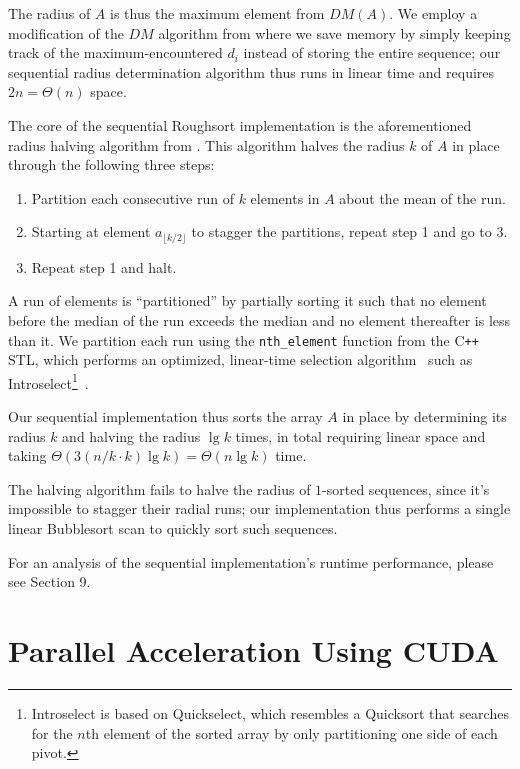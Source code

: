 \documentclass[letterpaper, 12pt]{article}
\let\supercite\cite
\renewcommand{\cite}[1]{\textnormal{~\supercite{#1}}}
\begin{document}
The radius of $A$ is thus the maximum element from $DM(A)$. We employ a modification of the $DM$ algorithm from
  \supercite{altman89} where we save memory by simply keeping track of the maximum-encountered $d_i$ instead of storing the
  entire sequence; our sequential radius determination algorithm thus runs in linear time and requires $2n = \Theta(n)$ space.

The core of the sequential Roughsort implementation is the aforementioned radius halving algorithm from \supercite{altman89}.
This algorithm halves the radius $k$ of $A$ in place through the following three steps:
\begin{enumerate}\setlength{\itemsep}{0pt}\setlength{\parskip}{0pt}
\item Partition each consecutive run of $k$ elements in $A$ about the mean of the run.
\item Starting at element $a_{\lfloor k/2 \rfloor}$ to stagger the partitions, repeat step 1 and go to 3.
\item Repeat step 1 and halt.
\end{enumerate}
A run of elements is ``partitioned'' by partially sorting it such that no element before the median of the run exceeds
  the median and no element thereafter is less than it.
We partition each run using the \texttt{nth_element} function from the  C\texttt{++} STL, which performs an optimized,
  linear-time selection algorithm\cite{clrs} such as
  Introselect\footnote{Introselect is based on Quickselect, which resembles a Quicksort
  that searches for the $n$th element of the sorted array by only partitioning one side of each pivot.}\cite{selectalg}.

Our sequential implementation thus sorts the array $A$ in place by determining its radius $k$ and halving the radius
  $\lg k$ times, in total requiring linear space and taking $\Theta(3(n/k \cdot k) \lg k) = \Theta(n \lg k)$ time.

The halving algorithm fails to halve the radius of $1$-sorted sequences, since it's impossible to stagger their radial runs;
  our implementation thus performs a single linear Bubblesort scan to quickly sort such sequences.

For an analysis of the sequential implementation's runtime performance, please see Section 9.

\section{Parallel Acceleration Using CUDA}
\end{document}

